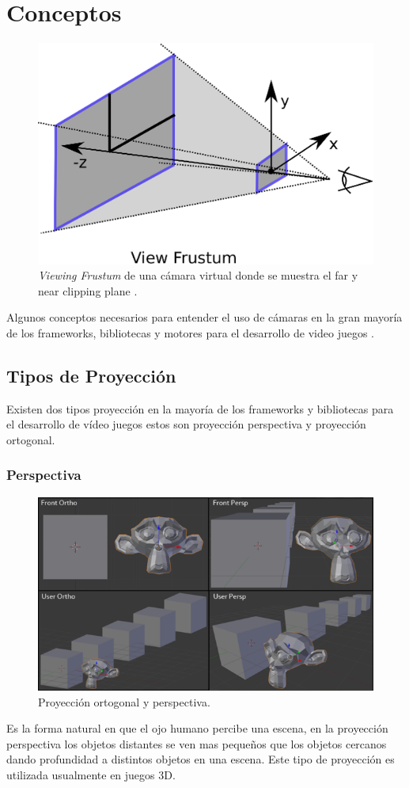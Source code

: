 \section{Conceptos}
\begin{figure}
\includegraphics[width=\linewidth]{semana2/frustum.eps}
\caption{\emph{Viewing Frustum} de una cámara virtual donde se muestra el far y near clipping plane \cite{microsoft_frustum}.}
\label{fig:frustum}
\end{figure}
Algunos conceptos necesarios para entender el uso de cámaras en la gran mayoría de los frameworks, bibliotecas y motores para el desarrollo de video juegos \cite{unity_camera}.
\subsection{Tipos de Proyección}
Existen dos tipos proyección en la mayoría de los frameworks y bibliotecas para el desarrollo de vídeo juegos estos son proyección perspectiva y proyección ortogonal.
\subsubsection{Perspectiva}
\setlength\intextsep{0pt}
\begin{figure}
\includegraphics[width=\linewidth]{semana2/projections.png}
\caption{Proyección ortogonal y perspectiva.}
\end{figure}
Es la forma natural en que el ojo humano percibe una escena, en la proyección perspectiva los objetos distantes se ven mas pequeños que los objetos cercanos dando profundidad a distintos objetos en una escena. Este tipo de proyección es utilizada usualmente en juegos 3D.
